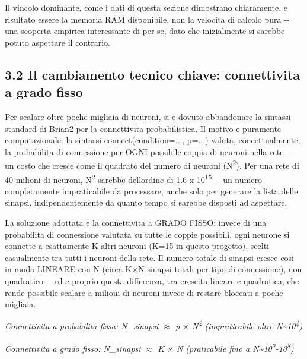 \documentclass[
  italian,
]{article}
\begin{document}
Il vincolo dominante, come i dati di questa sezione dimostrano chiaramente, e\textquotesingle{} risultato essere la memoria RAM disponibile, non la velocita\textquotesingle{} di calcolo pura -\/- una scoperta empirica interessante di per se\textquotesingle, dato che inizialmente si sarebbe potuto aspettare il contrario.

\subsection{3.2 Il cambiamento tecnico chiave: connettivita\textquotesingle{} a grado fisso}\label{il-cambiamento-tecnico-chiave-connettivita-a-grado-fisso}

Per scalare oltre poche migliaia di neuroni, si e\textquotesingle{} dovuto abbandonare la sintassi standard di Brian2 per la connettivita\textquotesingle{} probabilistica. Il motivo e\textquotesingle{} puramente computazionale: la sintassi connect(condition=..., p=...) valuta, concettualmente, la probabilita\textquotesingle{} di connessione per OGNI possibile coppia di neuroni nella rete -\/- un costo che cresce come il quadrato del numero di neuroni (N\textsuperscript{2}). Per una rete di 40 milioni di neuroni, N\textsuperscript{2} sarebbe dell\textquotesingle ordine di 1.6 x 10\textsuperscript{1}\textsuperscript{5} -\/- un numero completamente impraticabile da processare, anche solo per generare la lista delle sinapsi, indipendentemente da quanto tempo si sarebbe disposti ad aspettare.

La soluzione adottata e\textquotesingle{} la connettivita\textquotesingle{} a GRADO FISSO: invece di una probabilita\textquotesingle{} di connessione valutata su tutte le coppie possibili, ogni neurone si connette a esattamente K altri neuroni (K=15 in questo progetto), scelti casualmente tra tutti i neuroni della rete. Il numero totale di sinapsi cresce cosi\textquotesingle{} in modo LINEARE con N (circa K$\times$N sinapsi totali per tipo di connessione), non quadratico -\/- ed e\textquotesingle{} proprio questa differenza, tra crescita lineare e quadratica, che rende possibile scalare a milioni di neuroni invece di restare bloccati a poche migliaia.

\emph{Connettivita\textquotesingle{} a probabilita\textquotesingle{} fissa: N\_\allowbreak{}sinapsi $\approx$ p $\times$ N\textsuperscript{2} (impraticabile oltre N\textasciitilde10\textsuperscript{4})}

\emph{Connettivita\textquotesingle{} a grado fisso: N\_\allowbreak{}sinapsi $\approx$ K $\times$ N (praticabile fino a N\textasciitilde10\textsuperscript{7}-10\textsuperscript{8})}
\end{document}
